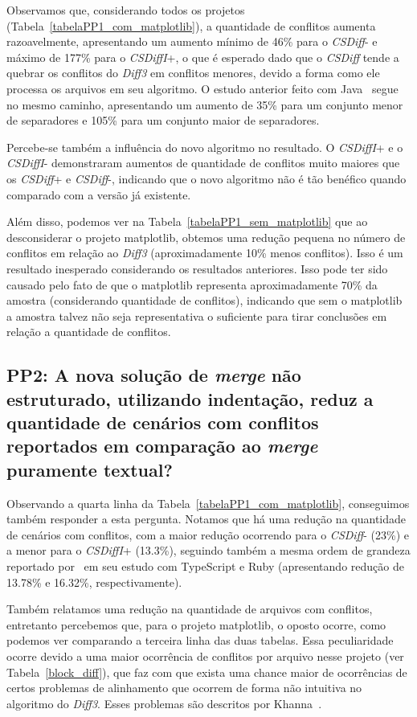 Observamos que, considerando todos os projetos
(Tabela~\ref{tabelaPP1_com_matplotlib}), a quantidade de conflitos aumenta
razoavelmente, apresentando um aumento mínimo de 46\% para o \emph{CSDiff}- e
máximo de 177\% para o \emph{CSDiffI}+, o que é esperado dado que o
\emph{CSDiff} tende a quebrar os conflitos do \emph{Diff3} em conflitos
menores, devido a forma como ele processa os arquivos em seu algoritmo. O
estudo anterior feito com Java~\cite{clem21} segue no mesmo caminho,
apresentando um aumento de 35\% para um conjunto menor de separadores e 105\%
para um conjunto maior de separadores.

Percebe-se também a influência do novo algoritmo no resultado. O
\emph{CSDiffI}+ e o \emph{CSDiffI}- demonstraram aumentos de quantidade de
conflitos muito maiores que os \emph{CSDiff}+ e \emph{CSDiff}-, indicando que o
novo algoritmo não é tão benéfico quando comparado com a versão já existente.

Além disso, podemos ver na Tabela~\ref{tabelaPP1_sem_matplotlib} que ao
desconsiderar o projeto matplotlib, obtemos uma redução pequena no número de
conflitos em relação ao \emph{Diff3} (aproximadamente 10\% menos conflitos).
Isso é um resultado inesperado considerando os resultados anteriores. Isso pode
ter sido causado pelo fato de que o matplotlib representa aproximadamente 70\%
da amostra (considerando quantidade de conflitos), indicando que sem o
matplotlib a amostra talvez não seja representativa o suficiente para tirar
conclusões em relação a quantidade de conflitos.

\subsection{PP2: A nova solução de \emph{merge} não estruturado, utilizando
indentação, reduz a quantidade de cenários com conflitos reportados em
comparação ao \emph{merge} puramente textual?}\label{resultado_pp2}

Observando a quarta linha da Tabela~\ref{tabelaPP1_com_matplotlib}, conseguimos
também responder a esta pergunta. Notamos que há uma redução na quantidade de
cenários com conflitos, com a maior redução ocorrendo para o \emph{CSDiff}-
(23\%) e a menor para o \emph{CSDiffI}+ (13.3\%), seguindo também a mesma ordem
de grandeza reportado por~\cite{heitor21} em seu estudo com TypeScript e Ruby
(apresentando redução de 13.78\% e 16.32\%, respectivamente).

Também relatamos uma redução na quantidade de arquivos com conflitos,
entretanto percebemos que, para o projeto matplotlib, o oposto ocorre, como
podemos ver comparando a terceira linha das duas tabelas. Essa peculiaridade
ocorre devido a uma maior ocorrência de conflitos por arquivo nesse projeto
(ver Tabela~\ref{block_diff}), que faz com que exista uma chance maior de
ocorrências de certos problemas de alinhamento que ocorrem de forma não
intuitiva no algoritmo do \emph{Diff3}. Esses problemas são descritos por
Khanna~\cite{khan07}.

